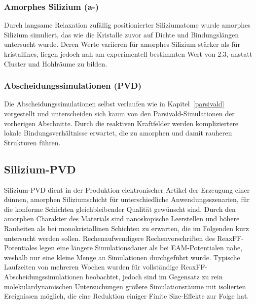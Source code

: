 \subsubsection{Amorphes Silizium (a-)}

Durch langsame Relaxation zufällig positionierter Siliziumatome wurde amorphes Silizium simuliert, das wie die Kristalle zuvor auf Dichte und Bindungslängen untersucht wurde.
Deren Werte variieren für amorphes Silizium stärker als für kristallines, liegen jedoch nah am experimentell bestimmten Wert von \SI{2.3}{\gpcc}\cite{remes_optical_1998}, anstatt Cluster und Hohlräume zu bilden.

\subsubsection{Abscheidungssimulationen (PVD)}

Die Abscheidungssimulationen selbst verlaufen wie in Kapitel~\ref{parsivald} vorgestellt und unterscheiden sich kaum von den Parsivald-Simulationen der vorherigen Abschnitte.
Durch die reaktiven Kraftfelder werden kompliziertere lokale Bindungsverhältnisse erwartet, die zu amorphen und damit rauheren Strukturen führen.

\subsection{Silizium-PVD}

Silizium-PVD dient in der Produktion elektronischer Artikel der Erzeugung einer dünnen, amorphen Siliziumschicht für unterschiedliche Anwendungsszenarien, für die konforme Schichten gleichbleibender Qualität gewünscht sind.
Durch den amorphen Charakter des Materials sind nanoskopische Leerstellen und höhere Rauheiten als bei monokristallinen Schichten zu erwarten, die im Folgenden kurz untersucht werden sollen.
Rechenaufwendigere Rechenvorschriften des ReaxFF-Potentiales legen eine längere Simulationsdauer als bei EAM-Potentialen nahe, weshalb nur eine kleine Menge an Simulationen durchgeführt wurde.
Typische Laufzeiten von mehreren Wochen wurden für vollständige ReaxFF-Abscheidungssimulationen beobachtet, jedoch sind im Gegensatz zu rein molekulardynamischen Untersuchungen größere Simulationsräume mit isolierten Ereignissen möglich, die eine Reduktion einiger Finite Size-Effekte zur Folge hat.

